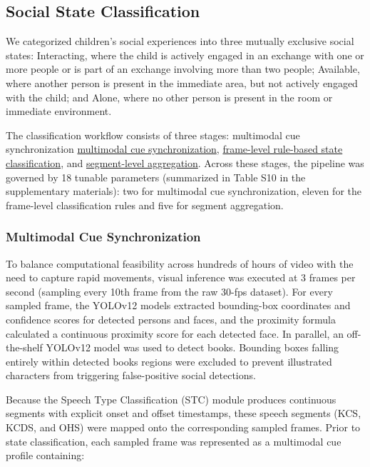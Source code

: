 \documentclass[
  english,
  12pt,
  man,floatsintext]{apa6}
\begin{document}
\subsection{Social State Classification}\label{state-fusion}

We categorized children's social experiences into three mutually exclusive social states: Interacting, where the child is actively engaged in an exchange with one or more people or is part of an exchange involving more than two people; Available, where another person is present in the immediate area, but not actively engaged with the child; and Alone, where no other person is present in the room or immediate environment.

The classification workflow consists of three stages: multimodal cue synchronization \hyperref[multimodal-cue-synchronization]{multimodal cue synchronization}, \hyperref[frame-level-classification]{frame-level rule-based state classification}, and \hyperref[segment-level-aggregation]{segment-level aggregation}. Across these stages, the pipeline was governed by 18 tunable parameters (summarized in Table S10 in the supplementary materials): two for multimodal cue synchronization, eleven for the frame-level classification rules and five for segment aggregation.

\subsubsection{Multimodal Cue Synchronization}\label{multimodal-cue-synchronization}

To balance computational feasibility across hundreds of hours of video with the need to capture rapid movements, visual inference was executed at 3 frames per second (sampling every 10th frame from the raw 30-fps dataset). For every sampled frame, the YOLOv12 models extracted bounding-box coordinates and confidence scores for detected persons and faces, and the proximity formula calculated a continuous proximity score for each detected face. In parallel, an off-the-shelf YOLOv12 model was used to detect books. Bounding boxes falling entirely within detected books regions were excluded to prevent illustrated characters from triggering false-positive social detections.

Because the Speech Type Classification (STC) module produces continuous segments with explicit onset and offset timestamps, these speech segments (KCS, KCDS, and OHS) were mapped onto the corresponding sampled frames. Prior to state classification, each sampled frame was represented as a multimodal cue profile containing:
\end{document}
